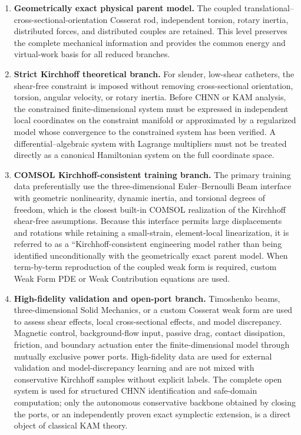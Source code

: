 \begin{enumerate}
\def\labelenumi{\arabic{enumi}.}
\tightlist
\item
  \textbf{Geometrically exact physical parent model.} The coupled translational--cross-sectional-orientation Cosserat rod, independent torsion, rotary inertia, distributed forces, and distributed couples are retained. This level preserves the complete mechanical information and provides the common energy and virtual-work basis for all reduced branches\cite{Simo1985FiniteStrainBeam,Antman2005Elasticity}.
\item
  \textbf{Strict Kirchhoff theoretical branch.} For slender, low-shear catheters, the shear-free constraint is imposed without removing cross-sectional orientation, torsion, angular velocity, or rotary inertia. Before CHNN or KAM analysis, the constrained finite-dimensional system must be expressed in independent local coordinates on the constraint manifold or approximated by a regularized model whose convergence to the constrained system has been verified. A differential--algebraic system with Lagrange multipliers must not be treated directly as a canonical Hamiltonian system on the full coordinate space.
\item
  \textbf{COMSOL Kirchhoff-consistent training branch.} The primary training data preferentially use the three-dimensional Euler--Bernoulli Beam interface with geometric nonlinearity, dynamic inertia, and torsional degrees of freedom, which is the closest built-in COMSOL realization of the Kirchhoff shear-free assumptions. Because this interface permits large displacements and rotations while retaining a small-strain, element-local linearization, it is referred to as a ``Kirchhoff-consistent engineering model rather than being identified unconditionally with the geometrically exact parent model\cite{COMSOLBeamInterface2025,COMSOLGeometricNonlinearity2025,COMSOLSectionStiffness2025}. When term-by-term reproduction of the coupled weak form is required, custom Weak Form PDE or Weak Contribution equations are used\cite{COMSOLWeakFormPDE2025,COMSOLWeakContribution2025}.
\item
  \textbf{High-fidelity validation and open-port branch.} Timoshenko beams, three-dimensional Solid Mechanics, or a custom Cosserat weak form are used to assess shear effects, local cross-sectional effects, and model discrepancy. Magnetic control, background-flow input, passive drag, contact dissipation, friction, and boundary actuation enter the finite-dimensional model through mutually exclusive power ports. High-fidelity data are used for external validation and model-discrepancy learning and are not mixed with conservative Kirchhoff samples without explicit labels. The complete open system is used for structured CHNN identification and safe-domain computation; only the autonomous conservative backbone obtained by closing the ports, or an independently proven exact symplectic extension, is a direct object of classical KAM theory.
\end{enumerate}

